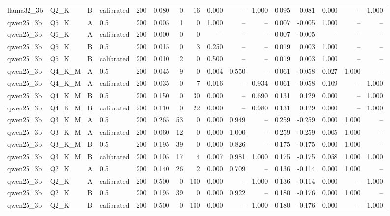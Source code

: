 \begin{tabular}{llllrrrrrrrrrrrr}
llama32\_3b & Q2\_K & B & calibrated & 200 & 0.080 & 0 & 16 & 0.000 & -- & 1.000 & 0.095 & 0.081 & 0.000 & -- & 1.000 \\
qwen25\_3b & Q6\_K & A & 0.5 & 200 & 0.005 & 1 & 0 & 1.000 & -- & -- & 0.007 & -0.005 & 1.000 & -- & -- \\
qwen25\_3b & Q6\_K & A & calibrated & 200 & 0.000 & 0 & 0 & -- & -- & -- & 0.007 & -0.005 & -- & -- & -- \\
qwen25\_3b & Q6\_K & B & 0.5 & 200 & 0.015 & 0 & 3 & 0.250 & -- & -- & 0.019 & 0.003 & 1.000 & -- & -- \\
qwen25\_3b & Q6\_K & B & calibrated & 200 & 0.010 & 2 & 0 & 0.500 & -- & -- & 0.019 & 0.003 & 1.000 & -- & -- \\
qwen25\_3b & Q4\_K\_M & A & 0.5 & 200 & 0.045 & 9 & 0 & 0.004 & 0.550 & -- & 0.061 & -0.058 & 0.027 & 1.000 & -- \\
qwen25\_3b & Q4\_K\_M & A & calibrated & 200 & 0.035 & 0 & 7 & 0.016 & -- & 0.934 & 0.061 & -0.058 & 0.109 & -- & 1.000 \\
qwen25\_3b & Q4\_K\_M & B & 0.5 & 200 & 0.150 & 0 & 30 & 0.000 & -- & 0.690 & 0.131 & 0.129 & 0.000 & -- & 1.000 \\
qwen25\_3b & Q4\_K\_M & B & calibrated & 200 & 0.110 & 0 & 22 & 0.000 & -- & 0.980 & 0.131 & 0.129 & 0.000 & -- & 1.000 \\
qwen25\_3b & Q3\_K\_M & A & 0.5 & 200 & 0.265 & 53 & 0 & 0.000 & 0.949 & -- & 0.259 & -0.259 & 0.000 & 1.000 & -- \\
qwen25\_3b & Q3\_K\_M & A & calibrated & 200 & 0.060 & 12 & 0 & 0.000 & 1.000 & -- & 0.259 & -0.259 & 0.005 & 1.000 & -- \\
qwen25\_3b & Q3\_K\_M & B & 0.5 & 200 & 0.195 & 39 & 0 & 0.000 & 0.826 & -- & 0.175 & -0.175 & 0.000 & 1.000 & -- \\
qwen25\_3b & Q3\_K\_M & B & calibrated & 200 & 0.105 & 17 & 4 & 0.007 & 0.981 & 1.000 & 0.175 & -0.175 & 0.058 & 1.000 & 1.000 \\
qwen25\_3b & Q2\_K & A & 0.5 & 200 & 0.140 & 26 & 2 & 0.000 & 0.709 & -- & 0.136 & -0.114 & 0.000 & 1.000 & -- \\
qwen25\_3b & Q2\_K & A & calibrated & 200 & 0.500 & 0 & 100 & 0.000 & -- & 1.000 & 0.136 & -0.114 & 0.000 & -- & 1.000 \\
qwen25\_3b & Q2\_K & B & 0.5 & 200 & 0.195 & 39 & 0 & 0.000 & 0.922 & -- & 0.180 & -0.176 & 0.000 & 1.000 & -- \\
qwen25\_3b & Q2\_K & B & calibrated & 200 & 0.500 & 0 & 100 & 0.000 & -- & 1.000 & 0.180 & -0.176 & 0.000 & -- & 1.000 \\
\bottomrule
\end{tabular}
